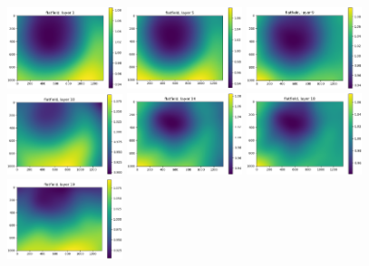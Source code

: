\documentclass[letterpaper,11pt]{article}
\begin{document}
\begin{figure}[!ht]
\centering
\includegraphics[width=0.3\textwidth]{images/results/flatfield_layers_vectra/flatfield_layer_1}
\includegraphics[width=0.3\textwidth]{images/results/flatfield_layers_vectra/flatfield_layer_5}
\includegraphics[width=0.3\textwidth]{images/results/flatfield_layers_vectra/flatfield_layer_9}
\includegraphics[width=0.3\textwidth]{images/results/flatfield_layers_vectra/flatfield_layer_10}
\includegraphics[width=0.3\textwidth]{images/results/flatfield_layers_vectra/flatfield_layer_14}
\includegraphics[width=0.3\textwidth]{images/results/flatfield_layers_vectra/flatfield_layer_18}
\includegraphics[width=0.3\textwidth]{images/results/flatfield_layers_vectra/flatfield_layer_19}

\end{figure}
\end{document}
